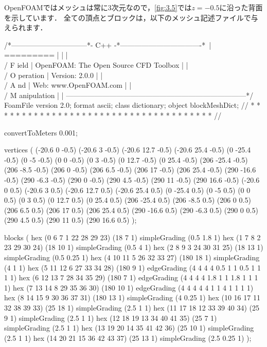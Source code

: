 OpenFOAMではメッシュは常に3次元なので，\autoref{fig:3.5}では$z = -0.5$に沿った背面を示しています．
全ての頂点とブロックは，以下のメッシュ記述ファイルで与えられます．
\begin{OFverbatim}
/*--------------------------------*- C++ -*----------------------------------*\
| =========                 |                                                 |
| \\      /  F ield         | OpenFOAM: The Open Source CFD Toolbox           |
|  \\    /   O peration     | Version:  2.0.0                                 |
|   \\  /    A nd           | Web:      www.OpenFOAM.com                      |
|    \\/     M anipulation  |                                                 |
\*---------------------------------------------------------------------------*/
FoamFile
{
    version     2.0;
    format      ascii;
    class       dictionary;
    object      blockMeshDict;
}
// * * * * * * * * * * * * * * * * * * * * * * * * * * * * * * * * * * * * * //

convertToMeters 0.001;

vertices
(
    (-20.6 0 -0.5)
    (-20.6 3 -0.5)
    (-20.6 12.7 -0.5)
    (-20.6 25.4 -0.5)
    (0 -25.4 -0.5)
    (0 -5 -0.5)
    (0 0 -0.5)
    (0 3 -0.5)
    (0 12.7 -0.5)
    (0 25.4 -0.5)
    (206 -25.4 -0.5)
    (206 -8.5 -0.5)
    (206 0 -0.5)
    (206 6.5 -0.5)
    (206 17 -0.5)
    (206 25.4 -0.5)
    (290 -16.6 -0.5)
    (290 -6.3 -0.5)
    (290 0 -0.5)
    (290 4.5 -0.5)
    (290 11 -0.5)
    (290 16.6 -0.5)
    (-20.6 0 0.5)
    (-20.6 3 0.5)
    (-20.6 12.7 0.5)
    (-20.6 25.4 0.5)
    (0 -25.4 0.5)
    (0 -5 0.5)
    (0 0 0.5)
    (0 3 0.5)
    (0 12.7 0.5)
    (0 25.4 0.5)
    (206 -25.4 0.5)
    (206 -8.5 0.5)
    (206 0 0.5)
    (206 6.5 0.5)
    (206 17 0.5)
    (206 25.4 0.5)
    (290 -16.6 0.5)
    (290 -6.3 0.5)
    (290 0 0.5)
    (290 4.5 0.5)
    (290 11 0.5)
    (290 16.6 0.5)
);

blocks
(
    hex (0 6 7 1 22 28 29 23) (18 7 1) simpleGrading (0.5 1.8 1)
    hex (1 7 8 2 23 29 30 24) (18 10 1) simpleGrading (0.5 4 1)
    hex (2 8 9 3 24 30 31 25) (18 13 1) simpleGrading (0.5 0.25 1)
    hex (4 10 11 5 26 32 33 27) (180 18 1) simpleGrading (4 1 1)
    hex (5 11 12 6 27 33 34 28) (180 9 1) edgeGrading (4 4 4 4 0.5 1 1 0.5 1 1 1 1)
    hex (6 12 13 7 28 34 35 29) (180 7 1) edgeGrading (4 4 4 4 1.8 1 1 1.8 1 1 1 1)
    hex (7 13 14 8 29 35 36 30) (180 10 1) edgeGrading (4 4 4 4 4 1 1 4 1 1 1 1)
    hex (8 14 15 9 30 36 37 31) (180 13 1) simpleGrading (4 0.25 1)
    hex (10 16 17 11 32 38 39 33) (25 18 1) simpleGrading (2.5 1 1)
    hex (11 17 18 12 33 39 40 34) (25 9 1) simpleGrading (2.5 1 1)
    hex (12 18 19 13 34 40 41 35) (25 7 1) simpleGrading (2.5 1 1)
    hex (13 19 20 14 35 41 42 36) (25 10 1) simpleGrading (2.5 1 1)
    hex (14 20 21 15 36 42 43 37) (25 13 1) simpleGrading (2.5 0.25 1)
);


\end{OFverbatim}
